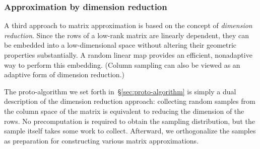 \documentclass[final]{siamltex}
\newcounter{algorithm}[section]
\newcommand{\notate}[1]{\textcolor{red}{\textbf{[#1]}}}
\begin{document}






%




\subsubsection{Approximation by dimension reduction}

A third approach to matrix approximation is based on the concept of
\emph{dimension reduction}. Since the rows of a low-rank matrix are
linearly dependent, they can be embedded into a low-dimensional
space without altering their geometric properties substantially.  A
random linear map provides an efficient, nonadaptive way to perform
this embedding.  (Column sampling can also be viewed as an adaptive
form of dimension reduction.)

The proto-algorithm we set forth in~\S\ref{sec:proto-algorithm}
is simply a dual description of
the dimension reduction approach: collecting random samples from the
column space of the matrix is equivalent to reducing the dimension
of the rows.  No precomputation is required to obtain the sampling
distribution, but the sample itself takes some work to collect.
Afterward, we orthogonalize the samples as preparation for
constructing various matrix approximations.
\end{document}
